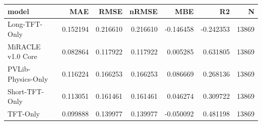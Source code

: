 \begin{tabular}{lrrrrrr}
\toprule
model & MAE & RMSE & nRMSE & MBE & R2 & N \\
\midrule
Long-TFT-Only & 0.152194 & 0.216610 & 0.216610 & -0.146458 & -0.242353 & 13869 \\
MiRACLE v1.0 Core & 0.082864 & 0.117922 & 0.117922 & 0.005285 & 0.631805 & 13869 \\
PVLib-Physics-Only & 0.116224 & 0.166253 & 0.166253 & 0.086669 & 0.268136 & 13869 \\
Short-TFT-Only & 0.113051 & 0.161461 & 0.161461 & 0.046274 & 0.309722 & 13869 \\
TFT-Only & 0.099888 & 0.139977 & 0.139977 & -0.050092 & 0.481198 & 13869 \\
\bottomrule
\end{tabular}
